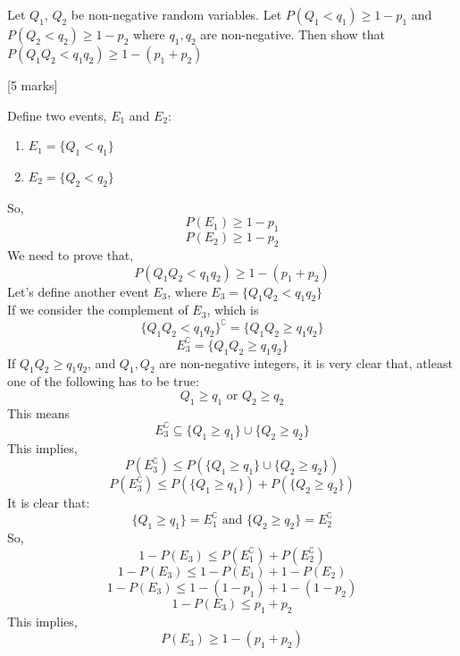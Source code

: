 \begin{que}
	Let $Q_{1}$, $Q_{2}$ be non-negative random variables. Let $P(Q_1 < q_1) \geq 1-p_1$ and $P(Q_2 < q_2) \geq 1-p_2$
	where $q_1, q_2$ are non-negative. Then show that $P(Q_1Q_2 < q_1q_2) \geq 1 - (p_1 + p_2)$

	\hspace*{\fill} [5 marks]
\end{que}

\begin{tcolorbox}[breakable]
	\begin{sol}
		Define two events, $E_1$ and $E_2$:
		\begin{enumerate}
			\item $E_1=\{Q_1<q_1\}$
			\item $E_2=\{Q_2<q_2\}$
		\end{enumerate}
		So,
		\[P(E_1)\geq 1-p_1\]
		\[P(E_2)\geq 1-p_2\]
		We need to prove that,
		\[ P(Q_1Q_2 < q_1q_2) \geq 1 - (p_1 + p_2)\]
		Let's define another event $E_3$, where $E_3=\{Q_1Q_2 < q_1q_2\}$\\
		If we consider the complement of $E_3$, which is
		\[\{Q_1Q_2 < q_1q_2\}^\complement=\{Q_1Q_2 \geq q_1q_2\}\]
		\[E_3^\complement=\{Q_1Q_2 \geq q_1q_2\}\]
		\clearpage
		If $Q_1Q_2 \geq q_1q_2$, and $Q_1,Q_2$ are non-negative integers, it is very clear that, atleast one of the following has to be true:
		\[Q_1\geq q_1 \text{ or }Q_2\geq q_2 \]
		This means \[E_3^\complement \subseteq \{Q_1\geq q_1\}\cup\{Q_2\geq q_2\} \]
		This implies,
		\[P(E_3^\complement)\leq P(\{Q_1\geq q_1\}\cup\{Q_2\geq q_2\} )\]
		\[P(E_3^\complement)\leq P(\{Q_1\geq q_1\})+P(\{Q_2\geq q_2\} )\]
		It is clear that:
		\[\{Q_1\geq q_1\} = E_1^\complement \text{ and } \{Q_2\geq q_2\} = E_2^\complement\]
		So,
		\[1-P(E_3)\leq P(E_1^\complement) + P(E_2^\complement)\]
		\[1-P(E_3)\leq 1-P(E_1) + 1-P(E_2)\]
		\[1-P(E_3)\leq 1-(1-p_1) + 1-(1-p_2)\]
		\[1-P(E_3)\leq p_1 +p_2\]
		This implies,
		\[P(E_3)\geq 1-(p_1+p_2)\]
	\end{sol}
\end{tcolorbox}

